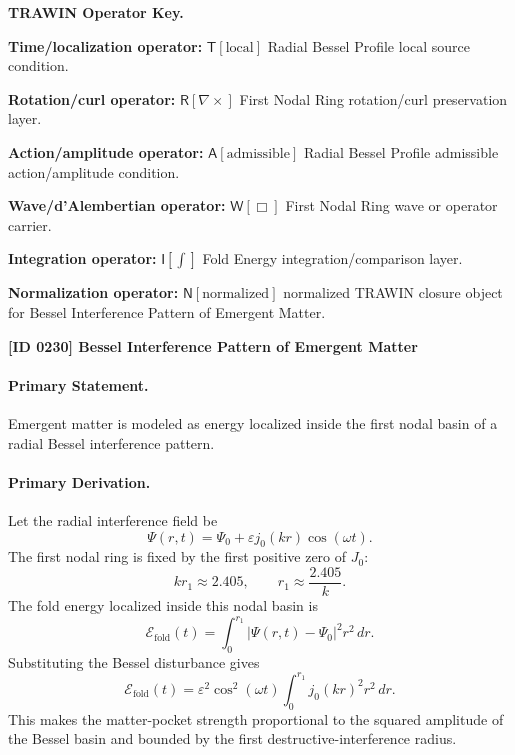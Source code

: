 \par\vspace{0.45\baselineskip}
\noindent\begin{minipage}[t]{\linewidth}
\begingroup
\small
\raggedright
\textbf{TRAWIN Operator Key.}\par
\noindent\textbf{Time/localization operator:} $\mathsf{T}\!\left[\mathrm{local}\right]$ Radial Bessel Profile local source condition.\par
\noindent\textbf{Rotation/curl operator:} $\mathsf{R}\!\left[\nabla\times\right]$ First Nodal Ring rotation/curl preservation layer.\par
\noindent\textbf{Action/amplitude operator:} $\mathsf{A}\!\left[\mathrm{admissible}\right]$ Radial Bessel Profile admissible action/amplitude condition.\par
\noindent\textbf{Wave/d'Alembertian operator:} $\mathsf{W}\!\left[\Box\right]$ First Nodal Ring wave or operator carrier.\par
\noindent\textbf{Integration operator:} $\mathsf{I}\!\left[\int\right]$ Fold Energy integration/comparison layer.\par
\noindent\textbf{Normalization operator:} $\mathsf{N}\!\left[\mathrm{normalized}\right]$ normalized TRAWIN closure object for Bessel Interference Pattern of Emergent Matter.\par
\endgroup
\end{minipage}

\clearpage
\noindent\textbf{[ID 0230] Bessel Interference Pattern of Emergent Matter}\par
\vspace{0.35em}
\paragraph{Primary Statement.}

Emergent matter is modeled as energy localized inside the first nodal basin of a radial Bessel interference pattern.

\paragraph{Primary Derivation.}

Let the radial interference field be
\[
\Psi(r,t)=\Psi_0+\varepsilon j_0(kr)\cos(\omega t).
\]
The first nodal ring is fixed by the first positive zero of \(J_0\):
\[
kr_1\approx 2.405,
\qquad
r_1\approx \frac{2.405}{k}.
\]
The fold energy localized inside this nodal basin is
\[
\mathcal{E}_{\mathrm{fold}}(t)=\int_{0}^{r_1}|\Psi(r,t)-\Psi_0|^2 r^2\,dr.
\]
Substituting the Bessel disturbance gives
\[
\mathcal{E}_{\mathrm{fold}}(t)=\varepsilon^2\cos^2(\omega t)\int_{0}^{r_1}j_0(kr)^2 r^2\,dr.
\]
This makes the matter-pocket strength proportional to the squared amplitude of the Bessel basin and bounded by the first destructive-interference radius.

